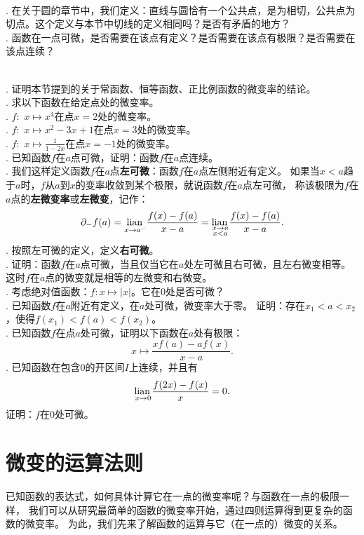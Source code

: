 \documentclass[12pt,UTF8]{ctexbook}
\begin{document}
\begin{sk}
    \mbox{} \\
    . 在关于圆的章节中，我们定义：直线与圆恰有一个公共点，是为相切，公共点为切点。这个定义与本节中切线的定义相同吗？是否有矛盾的地方？\\
    . 函数在一点可微，是否需要在该点有定义？是否需要在该点有极限？是否需要在该点连续？
\end{sk}

\begin{xt}
    \mbox{} \\
    . 证明本节提到的关于常函数、恒等函数、正比例函数的微变率的结论。\\
    . 求以下函数在给定点处的微变率。\\
    . $f: \,\, x \mapsto x^4$在点$x = 2$处的微变率。\\
    . $f: \,\, x \mapsto x^2 - 3x + 1$在点$x = 3$处的微变率。\\
    . $f: \,\, x \mapsto \frac{1}{1 - 2x}$在点$x = -1$处的微变率。\\
    . 已知函数$f$在$a$点可微，证明：函数$f$在$a$点连续。\\
    . 我们这样定义函数$f$在$a$点\textbf{左可微}：函数$f$在$a$点左侧附近有定义。
    如果当$x<a$趋于$a$时，$f$从$a$到$x$的变率收敛到某个极限，就说函数$f$在$a$点左可微，
    称该极限为$f$在$a$点的\textbf{左微变率}或\textbf{左微变}，记作：
    $$ \partial_- f(a) = \underset{x\to a^-}{\operatorname{lian}\,} \frac{f(x) - f(a)}{x - a} = \underset{\substack{x\to a \\ x < a}}{\operatorname{lian}\,} \frac{f(x) - f(a)}{x - a}. $$
    . 按照左可微的定义，定义\textbf{右可微}。\\
    . 证明：函数$f$在$a$点可微，当且仅当它在$a$处左可微且右可微，且左右微变相等。
    这时$f$在$a$点的微变就是相等的左微变和右微变。\\
    . 考虑绝对值函数：$f:x\mapsto |x|$。它在$0$处是否可微？\\
    . 已知函数$f$在$a$附近有定义，在$a$处可微，微变率大于零。
    证明：存在$x_1 < a < x_2$，使得$f(x_1) < f(a) < f(x_2)$。\\
    . 已知函数$f$在点$a$处可微，证明以下函数在$a$处有极限：
    $$ x \mapsto \frac{xf(a) - af(x)}{x - a}.$$
    . 已知函数在包含$0$的开区间$I$上连续，并且有
    $$ \underset{x\to 0}{\operatorname{lian}\,} \frac{f(2x) - f(x)}{x} = 0.$$
    \indent 证明：$f$在$0$处可微。
\end{xt}

\section{微变的运算法则}
已知函数的表达式，如何具体计算它在一点的微变率呢？与函数在一点的极限一样，
我们可以从研究最简单的函数的微变率开始，通过四则运算得到更复杂的函数的微变率。
为此，我们先来了解函数的运算与它（在一点的）微变的关系。
\end{document}
